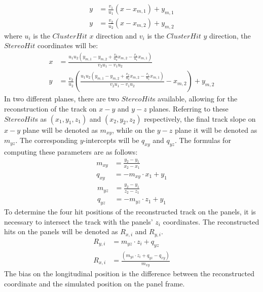 \begin{equation}
    \begin{aligned}
        y&=\frac{v_1}{u_1}(x-x_{m,1})+y_{m,1} \\
        y&=\frac{v_2}{u_2}(x-x_{m,2})+y_{m,2} 
    \end{aligned}
    \end{equation}
where $u_i$ is the $ClusterHit$ $x$ direction and $v_i$ is the $ClusterHit$ $y$ direction, the $StereoHit$ coordinates will be:
\begin{equation}\label{x}
    \begin{aligned}
x&=\frac{u_1 u_2(y_{m,1}-y_{m,2}+\frac{v_2}{u_2}x_{m,2}-\frac{v_1}{u_1}x_{m,1})}{v_2 u_1 - v_1 u_2}\\
y&=\frac{v_2}{u_2}\left(\frac{u_1 u_2(y_{m,1}-y_{m,2}+\frac{v_2}{u_2}x_{m,2}-\frac{v_1}{u_1}x_{m,1})}{v_2 u_1 - v_1 u_2}-x_{m,2}\right)+y_{m,2}
\end{aligned}
\end{equation}
In two different planes, there are two $StereoHit$s available, allowing for the reconstruction of the track on $x-y$ and $y-z$ planes. 
Referring to these $StereoHit$s as $(x_1,y_1,z_1)$ and $(x_2,y_2,z_2)$ respectively, the final track slope on $x-y$ plane will be 
denoted as $m_{xy}$, while on the $y-z$ plane it will be denoted as $m_{yz}$. The corresponding $y$-intercepts will be $q_{xy}$ and $q_{yz}$.
The formulas for computing these parameters are as follows:
\begin{equation}
    \begin{aligned}
m_{xy}&=\frac{y_2-y_1}{x_2-x_1}\\
q_{xy}&=-m_{xy} \cdot x_1+y_1
\end{aligned}
\end{equation}
\begin{equation}
    \begin{aligned}
m_{yz}&=\frac{y_2-y_1}{z_2-z_1}\\
q_{yz}&=-m_{yz} \cdot z_1+y_1
\end{aligned}
\end{equation}
To determine the four hit positions of the reconstructed track on the panels, it is necessary to intersect the track with the panels' $z_i$ coordinates. 
The reconstructed hits on the panels will be denoted as $R_{x,i}$ and $R_{y,i}$.
\begin{equation}
    \begin{aligned}
 R_{y,i}&=m_{yz}\cdot z_i+q_{yz}\\
 R_{x,i}&=\frac{(m_{yz}\cdot z_i+q_{yz}-q_{xy})}{m_{xy}}
\end{aligned}
\end{equation}
The bias on the longitudinal position is the difference between 
the reconstructed coordinate and the simulated position 
on the panel frame.

